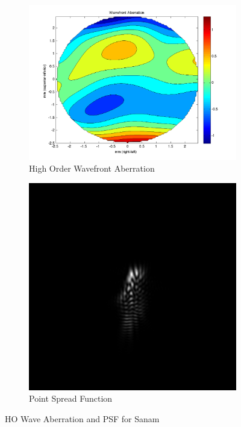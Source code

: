\documentclass{article}
\begin{document}
\clearpage

\begin{figure}[H]
\begin{subfigure}{.5\textwidth}
  \centering
  \includegraphics[width=1\linewidth]{Sanam_WFA.png}
  \caption{High Order Wavefront Aberration}
  \label{fig:sanamhowa}
\end{subfigure}%
\begin{subfigure}{.5\textwidth}
  \centering
  \includegraphics[width=.8\linewidth]{Sanam_PSF.png}
  \caption{Point Spread Function}
  \label{fig:sanampsf}
\end{subfigure}
\caption{HO Wave Aberration and PSF for Sanam}
\label{fig:sanam}
\end{figure}
\end{document}
